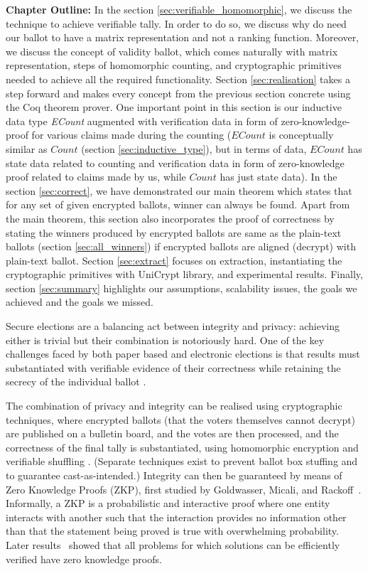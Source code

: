 \textbf{Chapter Outline:} In the section \ref{sec:verifiable_homomorphic}, 
we discuss the technique to achieve verifiable tally. In order to do so, 
we discuss why do need our ballot to have a matrix representation 
and not a ranking function. Moreover, we discuss the concept 
of validity ballot, which comes naturally with matrix representation, 
steps of homomorphic counting, and cryptographic primitives needed 
to achieve all the required functionality. Section \ref{sec:realisation} 
takes a step forward and makes every concept from the previous section
concrete using the Coq theorem prover. One important point 
in this section is our inductive data type \textit{ECount}
augmented with verification data in form of zero-knowledge-proof 
for various claims made during the counting 
($ECount$ is conceptually similar as $Count$ (section \ref{sec:inductive_type}), but 
in terms of data, $ECount$ has state data related to counting and verification data
in form of zero-knowledge proof related to claims made by us, while $Count$ 
has just state data).  In the section \ref{sec:correct}, we have demonstrated 
our main theorem which states that for any set of given encrypted ballots, 
winner can always be found. Apart from the main theorem, this section 
also incorporates the proof of correctness by stating 
the winners produced by encrypted ballots are same as 
 the plain-text ballots (section \ref{sec:all_winners}) if 
 encrypted ballots are aligned (decrypt) with plain-text ballot. 
 Section \ref{sec:extract} focuses on extraction, instantiating 
 the cryptographic primitives with UniCrypt library, and 
 experimental results. Finally, section \ref{sec:summary} 
 highlights our assumptions, scalability issues, the 
 goals we achieved and the goals we missed. 


 


Secure elections are a balancing act between integrity and privacy:
achieving either is trivial but their combination is notoriously hard.
One of the key challenges faced by both paper based and electronic
elections is that results must substantiated with
verifiable evidence of their correctness while retaining the secrecy
of the individual ballot \citep{Bernhard:2017:PES}.  


The combination of privacy and integrity can be realised using cryptographic techniques, where
encrypted ballots (that the voters themselves cannot decrypt) are
published on a bulletin board, and the votes are then processed, and
the correctness of the final tally is substantiated, using
homomorphic encryption \citep{Hirt:2000:ERF} and verifiable shuffling
\citep{Bayer:2012:EZK}. (Separate techniques exist to prevent ballot
box stuffing and to guarantee cast-as-intended.)
Integrity can then be guaranteed by means of Zero Knowledge Proofs
(ZKP),
first studied by Goldwasser, Micali, and Rackoff~\citep{Goldwasser:1985:STOC}.
Informally, a ZKP is a probabilistic and interactive proof where one
entity interacts with another such that the interaction provides
no information other than that the statement being proved is true with
overwhelming probability. 
Later results~\citep{Ben-Or:1988:CRYPTO,Goldreich:1991:ACM}
showed that 
all problems for which solutions can be efficiently verified have zero knowledge
proofs.

